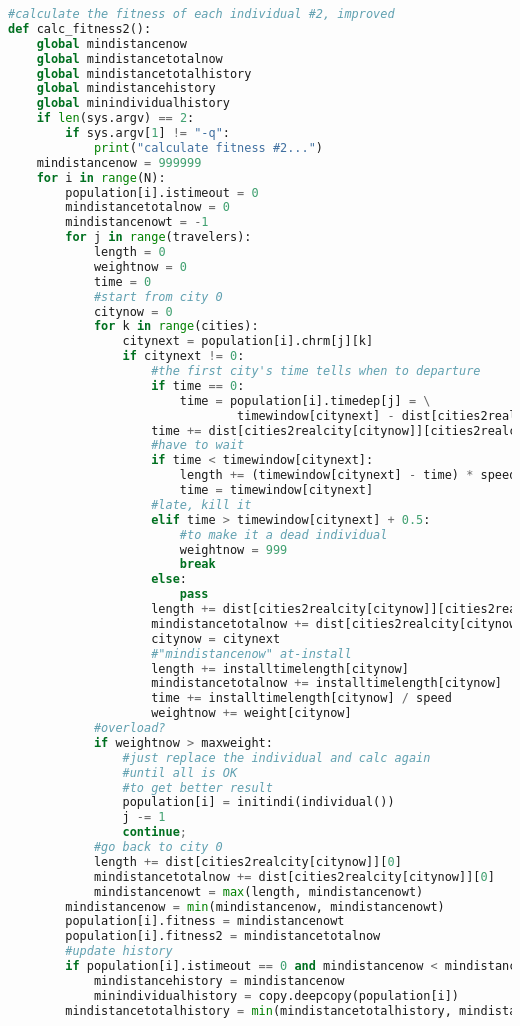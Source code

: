 \documentclass[UTF8,cs4size]{ctexart}
\begin{document}
\begin{lstlisting}[language=Python]
#calculate the fitness of each individual #2, improved
def calc_fitness2():
    global mindistancenow
    global mindistancetotalnow
    global mindistancetotalhistory
    global mindistancehistory
    global minindividualhistory
    if len(sys.argv) == 2:
        if sys.argv[1] != "-q":
            print("calculate fitness #2...")
    mindistancenow = 999999
    for i in range(N):
        population[i].istimeout = 0
        mindistancetotalnow = 0
        mindistancenowt = -1
        for j in range(travelers):
            length = 0
            weightnow = 0
            time = 0
            #start from city 0
            citynow = 0
            for k in range(cities):
                citynext = population[i].chrm[j][k]
                if citynext != 0:
                    #the first city's time tells when to departure
                    if time == 0:
                        time = population[i].timedep[j] = \
                                timewindow[citynext] - dist[cities2realcity[citynow]][cities2realcity[citynext]] / speed
                    time += dist[cities2realcity[citynow]][cities2realcity[citynext]] / speed
                    #have to wait
                    if time < timewindow[citynext]:
                        length += (timewindow[citynext] - time) * speed
                        time = timewindow[citynext]
                    #late, kill it
                    elif time > timewindow[citynext] + 0.5:
                        #to make it a dead individual
                        weightnow = 999
                        break
                    else:
                        pass
                    length += dist[cities2realcity[citynow]][cities2realcity[citynext]]
                    mindistancetotalnow += dist[cities2realcity[citynow]][cities2realcity[citynext]]
                    citynow = citynext
                    #"mindistancenow" at-install
                    length += installtimelength[citynow]
                    mindistancetotalnow += installtimelength[citynow]
                    time += installtimelength[citynow] / speed
                    weightnow += weight[citynow]
            #overload?
            if weightnow > maxweight:
                #just replace the individual and calc again
                #until all is OK
                #to get better result
                population[i] = initindi(individual())
                j -= 1
                continue;
            #go back to city 0
            length += dist[cities2realcity[citynow]][0]
            mindistancetotalnow += dist[cities2realcity[citynow]][0]
            mindistancenowt = max(length, mindistancenowt)
        mindistancenow = min(mindistancenow, mindistancenowt)
        population[i].fitness = mindistancenowt
        population[i].fitness2 = mindistancetotalnow
        #update history
        if population[i].istimeout == 0 and mindistancenow < mindistancehistory:
            mindistancehistory = mindistancenow
            minindividualhistory = copy.deepcopy(population[i])
        mindistancetotalhistory = min(mindistancetotalhistory, mindistancetotalnow)


\end{lstlisting}
\end{document}

